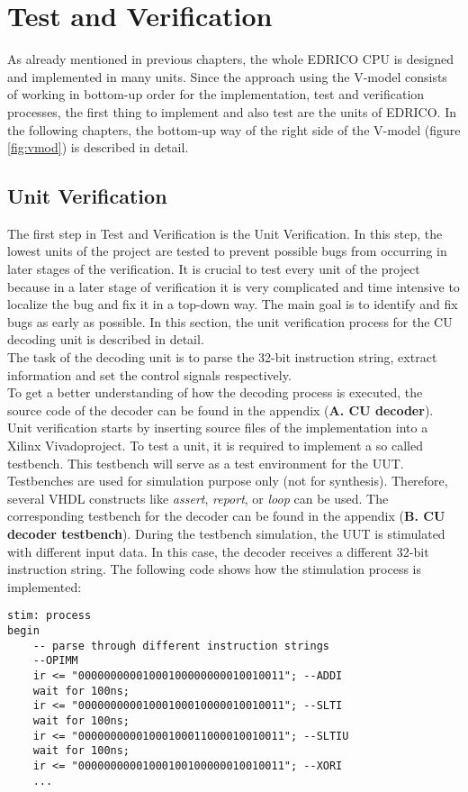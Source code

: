 \chapter{Test and Verification}
As already mentioned in previous chapters, the whole EDRICO CPU is designed and implemented in many units. Since the approach using the V-model consists of working in bottom-up order for the implementation, test and verification processes, the first thing to implement and also test are the units of EDRICO. In the following chapters, the bottom-up way of the right side of the V-model (figure \ref{fig:vmod}) is described in detail.
\section{Unit Verification}
The first step in Test and Verification is the Unit Verification. In this step, the lowest units of the project are tested to prevent possible bugs from occurring in later stages of the verification. It is crucial to test every unit of the project because in a later stage of verification it is very complicated and time intensive to localize the bug and fix it in a top-down way. The main goal is to identify and fix bugs as early as possible. In this section, the unit verification process for the CU decoding unit is described in detail.\\
The task of the decoding unit is to parse the 32-bit instruction string, extract information and set the control signals respectively.\\
To get a better understanding of how the decoding process is executed, the source code of the decoder can be found in the appendix (\textbf{A. CU decoder}).\\
Unit verification starts by inserting source files of the implementation into a Xilinx Vivado\textcopyright  project. To test a unit, it is required to implement a so called testbench. This testbench will serve as a test environment for the \ac{UUT}. Testbenches are used for simulation purpose only (not for synthesis). Therefore, several VHDL constructs like \textit{assert}, \textit{report}, or \textit{loop} can be used. The corresponding testbench for the decoder can be found in the appendix (\textbf{B. CU decoder testbench}). During the testbench simulation, the UUT is stimulated with different input data. In this case, the decoder receives a different 32-bit instruction string. The following code shows how the stimulation process is implemented:
\begin{lstlisting}[style=vhdl, caption=CU testbench stimulation process]
stim: process
begin
	-- parse through different instruction strings
	--OPIMM
	ir <= "00000000001000100000000010010011"; --ADDI
	wait for 100ns;
	ir <= "00000000001000100010000010010011"; --SLTI
	wait for 100ns;
	ir <= "00000000001000100011000010010011"; --SLTIU
	wait for 100ns;
	ir <= "00000000001000100100000010010011"; --XORI
	...
\end{lstlisting}
